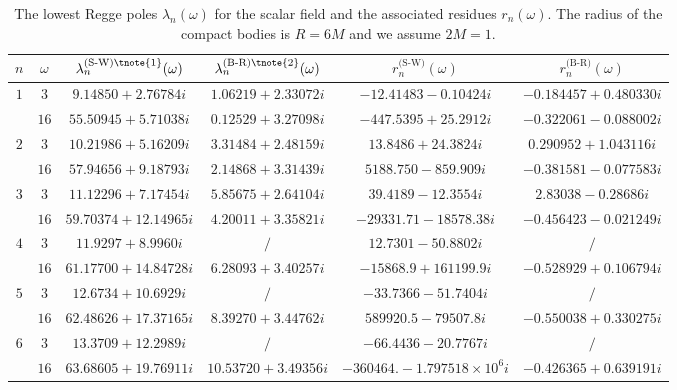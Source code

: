 \documentclass[aps,prd,longbibliography,reprint,twocolumn,amsmath,amssymb,amsfonts,showpacs,superscriptaddress]{revtex4-1}%
\begin{document}
\begingroup
\squeezetable
\begin{table}[htp]
\begin{threeparttable}[htp]
\caption{\label{tab:table2} The lowest Regge poles $\lambda_{n}(\omega)$ for the scalar field and the associated residues $r_{n}(\omega)$. The radius of the compact bodies is $R = 6M$ and we assume $2M=1$.}
\smallskip
\centering
\begin{ruledtabular}
\begin{tabular}{cccccc}
 $n$ & $\omega$  & $\lambda^{\text{(S-W)\tnote{1}}}_n(\omega)$ & $\lambda^{\text{(B-R)\tnote{2}}}_n(\omega)$ & $r^{\text{(S-W)}}_{n}(\omega)$ & $r^{\text{(B-R)}}_{n}(\omega)$
 \\ \hline
$1$  & $3$  & $ 9.14850+2.76784 i$  & $1.06219+2.33072 i$  & $-12.41483-0.10424 i$  & $ -0.184457+0.480330 i$    \\
     & $16$  & $55.50945+5.71038 i$  & $ 0.12529+3.27098 i$  & $-447.5395+25.2912 i$  & $-0.322061-0.088002 i $  \\

$2$  & $3$  & $ 10.21986+5.16209 i $  & $3.31484+2.48159 i$  & $13.8486+24.3824 i$  & $0.290952+1.043116 i$    \\
     & $16$  & $ 57.94656+9.18793 i$  & $2.14868+3.31439 i$  & $5188.750-859.909 i$  & $ -0.381581-0.077583 i$    \\

$3$  & $3$  & $11.12296+7.17454 i$  & $ 5.85675+2.64104 i$  & $39.4189-12.3554 i$ & $2.83038-0.28686 i$    \\
     & $16$  & $59.70374+12.14965 i$  & $4.20011+3.35821 i$  & $-29331.71-18578.38 i$  & $-0.456423-0.021249 i$ \\

$4$  & $3$  & $ 11.9297+8.9960 i$  & $/$  & $ 12.7301-50.8802 i$ & $/$    \\
     & $16$  & $ 61.17700+14.84728 i $  & $6.28093+3.40257 i$  & $-15868.9+161199.9 i$  & $-0.528929+0.106794 i$ \\

$5$  & $3$  & $12.6734+10.6929 i$  & $/$  & $-33.7366-51.7404 i$ & $/$     \\
     & $16$  & $62.48626+17.37165 i$  & $8.39270+3.44762 i$  & $589920.5-79507.8 i$  & $-0.550038+0.330275 i$    \\

$6$  & $3$  & $13.3709+12.2989 i$  & $/$   & $-66.4436-20.7767 i$ & $/$    \\
     & $16$  & $ 63.68605+19.76911 i$  & $10.53720+3.49356 i$  & $-360464.-1.797518\times 10^6 i$  & $ -0.426365+0.639191 i$    \\


\end{tabular}
\end{ruledtabular}
\end{threeparttable}
\end{table}
\end{document}
